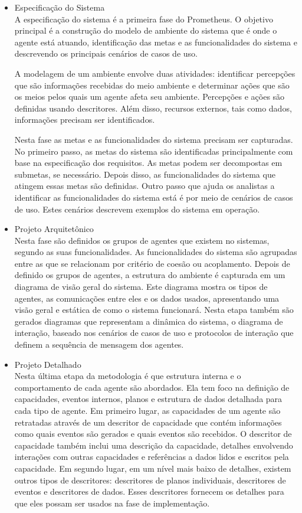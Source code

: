\begin{itemize}
\item Especificação do Sistema \\
A especificação do sistema é a primeira fase do Prometheus. O objetivo principal é a construção do modelo de ambiente do sistema que é onde o agente está atuando, identificação das metas e as funcionalidades do sistema e descrevendo os principais cenários de casos de uso.

A modelagem de um ambiente envolve duas atividades: identificar percepções que são informações recebidas do meio ambiente e determinar ações que são os meios pelos quais um agente afeta seu ambiente. Percepções e ações são definidas usando descritores. Além disso, recursos externos, tais como dados, informações precisam ser identificados.

Nesta fase as metas e as funcionalidades do sistema precisam ser capturadas. No primeiro passo, as metas do sistema são identificadas principalmente com base na especificação dos requisitos. As metas podem ser decompostas em submetas, se necessário. Depois disso, as funcionalidades do sistema que atingem essas metas são definidas. Outro passo que ajuda os analistas a identificar as funcionalidades do sistema está é por meio de cenários de casos de uso. Estes cenários descrevem exemplos do sistema em operação.

\item Projeto Arquitetônico \\

Nesta fase são definidos os grupos de agentes que existem no sistemas, segundo as suas funcionalidades. As funcionalidades do sistema são agrupadas entre as que se relacionam por critério de coesão ou acoplamento. Depois de definido os grupos de agentes, a estrutura do ambiente é capturada em um diagrama de visão geral do sistema. Este diagrama mostra os tipos de agentes, as comunicações entre eles e os dados usados, apresentando uma visão geral e estática de como o sistema funcionará. Nesta etapa também são gerados diagramas que representam a dinâmica do sistema, o diagrama de interação, baseado nos cenários de casos de uso e protocolos de interação que definem a sequência de mensagem dos agentes.

\item Projeto Detalhado \\

Nesta última etapa da metodologia é que estrutura interna e o comportamento de cada agente são abordados. Ela tem foco na definição de capacidades, eventos internos, planos e estrutura de dados detalhada para cada tipo de agente. Em primeiro lugar, as capacidades de um agente são retratadas através de um descritor de capacidade que contém informações como quais eventos são gerados e quais eventos são recebidos. O descritor de capacidade também inclui uma descrição da capacidade, detalhes envolvendo interações com outras capacidades e referências a dados lidos e escritos pela capacidade. Em segundo lugar, em um nível mais baixo de detalhes, existem outros tipos de descritores: descritores de planos individuais, descritores de eventos e descritores de dados. Esses descritores fornecem os detalhes para que eles possam ser usados na fase de implementação.


\end{itemize}
